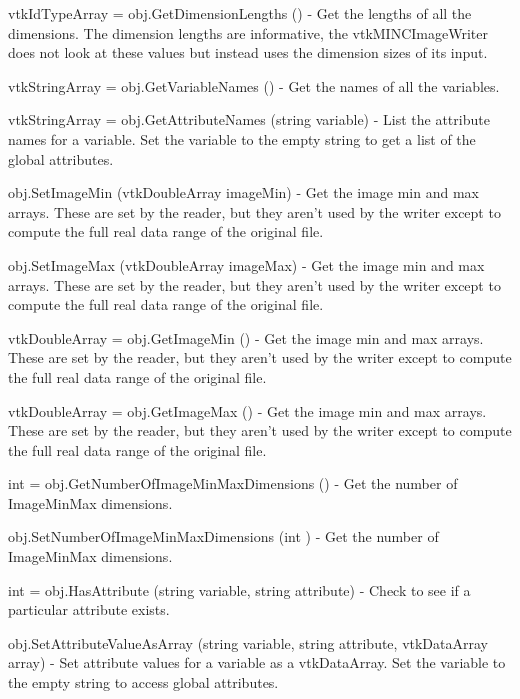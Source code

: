 \begin{DoxyItemize}
\item {\ttfamily vtk\-Id\-Type\-Array = obj.\-Get\-Dimension\-Lengths ()} -\/ Get the lengths of all the dimensions. The dimension lengths are informative, the vtk\-M\-I\-N\-C\-Image\-Writer does not look at these values but instead uses the dimension sizes of its input.  
\item {\ttfamily vtk\-String\-Array = obj.\-Get\-Variable\-Names ()} -\/ Get the names of all the variables.  
\item {\ttfamily vtk\-String\-Array = obj.\-Get\-Attribute\-Names (string variable)} -\/ List the attribute names for a variable. Set the variable to the empty string to get a list of the global attributes.  
\item {\ttfamily obj.\-Set\-Image\-Min (vtk\-Double\-Array image\-Min)} -\/ Get the image min and max arrays. These are set by the reader, but they aren't used by the writer except to compute the full real data range of the original file.  
\item {\ttfamily obj.\-Set\-Image\-Max (vtk\-Double\-Array image\-Max)} -\/ Get the image min and max arrays. These are set by the reader, but they aren't used by the writer except to compute the full real data range of the original file.  
\item {\ttfamily vtk\-Double\-Array = obj.\-Get\-Image\-Min ()} -\/ Get the image min and max arrays. These are set by the reader, but they aren't used by the writer except to compute the full real data range of the original file.  
\item {\ttfamily vtk\-Double\-Array = obj.\-Get\-Image\-Max ()} -\/ Get the image min and max arrays. These are set by the reader, but they aren't used by the writer except to compute the full real data range of the original file.  
\item {\ttfamily int = obj.\-Get\-Number\-Of\-Image\-Min\-Max\-Dimensions ()} -\/ Get the number of Image\-Min\-Max dimensions.  
\item {\ttfamily obj.\-Set\-Number\-Of\-Image\-Min\-Max\-Dimensions (int )} -\/ Get the number of Image\-Min\-Max dimensions.  
\item {\ttfamily int = obj.\-Has\-Attribute (string variable, string attribute)} -\/ Check to see if a particular attribute exists.  
\item {\ttfamily obj.\-Set\-Attribute\-Value\-As\-Array (string variable, string attribute, vtk\-Data\-Array array)} -\/ Set attribute values for a variable as a vtk\-Data\-Array. Set the variable to the empty string to access global attributes.  

\end{DoxyItemize}
